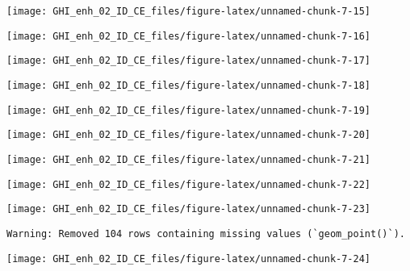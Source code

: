 \documentclass[
  10pt,
  a4paper,oneside]{article}
\begin{document}
\begin{center}\texttt{[image: GHI\_enh\_02\_ID\_CE\_files/figure-latex/unnamed-chunk-7-15]} \end{center}

\begin{center}\texttt{[image: GHI\_enh\_02\_ID\_CE\_files/figure-latex/unnamed-chunk-7-16]} \end{center}

\begin{center}\texttt{[image: GHI\_enh\_02\_ID\_CE\_files/figure-latex/unnamed-chunk-7-17]} \end{center}

\begin{center}\texttt{[image: GHI\_enh\_02\_ID\_CE\_files/figure-latex/unnamed-chunk-7-18]} \end{center}

\begin{center}\texttt{[image: GHI\_enh\_02\_ID\_CE\_files/figure-latex/unnamed-chunk-7-19]} \end{center}

\begin{center}\texttt{[image: GHI\_enh\_02\_ID\_CE\_files/figure-latex/unnamed-chunk-7-20]} \end{center}

\begin{center}\texttt{[image: GHI\_enh\_02\_ID\_CE\_files/figure-latex/unnamed-chunk-7-21]} \end{center}

\begin{center}\texttt{[image: GHI\_enh\_02\_ID\_CE\_files/figure-latex/unnamed-chunk-7-22]} \end{center}

\begin{center}\texttt{[image: GHI\_enh\_02\_ID\_CE\_files/figure-latex/unnamed-chunk-7-23]} \end{center}

\begin{verbatim}
Warning: Removed 104 rows containing missing values (`geom_point()`).
\end{verbatim}

\begin{center}\texttt{[image: GHI\_enh\_02\_ID\_CE\_files/figure-latex/unnamed-chunk-7-24]} \end{center}
\end{document}
